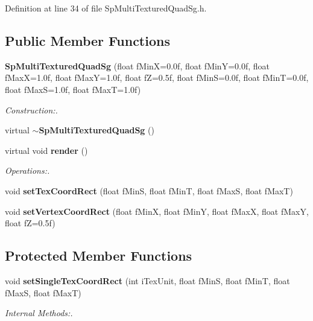 Definition at line 34 of file Sp\-Multi\-Textured\-Quad\-Sg.h.\subsection*{Public Member Functions}
\begin{CompactItemize}
\item 
{\bf Sp\-Multi\-Textured\-Quad\-Sg} (float f\-Min\-X=0.0f, float f\-Min\-Y=0.0f, float f\-Max\-X=1.0f, float f\-Max\-Y=1.0f, float f\-Z=0.5f, float f\-Min\-S=0.0f, float f\-Min\-T=0.0f, float f\-Max\-S=1.0f, float f\-Max\-T=1.0f)
\begin{CompactList}\small\item\em Construction:. \item\end{CompactList}\item 
virtual {\bf $\sim$Sp\-Multi\-Textured\-Quad\-Sg} ()
\item 
virtual void {\bf render} ()
\begin{CompactList}\small\item\em Operations:. \item\end{CompactList}\item 
void {\bf set\-Tex\-Coord\-Rect} (float f\-Min\-S, float f\-Min\-T, float f\-Max\-S, float f\-Max\-T)
\item 
void {\bf set\-Vertex\-Coord\-Rect} (float f\-Min\-X, float f\-Min\-Y, float f\-Max\-X, float f\-Max\-Y, float f\-Z=0.5f)
\end{CompactItemize}
\subsection*{Protected Member Functions}
\begin{CompactItemize}
\item 
void {\bf set\-Single\-Tex\-Coord\-Rect} (int i\-Tex\-Unit, float f\-Min\-S, float f\-Min\-T, float f\-Max\-S, float f\-Max\-T)
\begin{CompactList}\small\item\em Internal Methods:. \item\end{CompactList}\end{CompactItemize}
